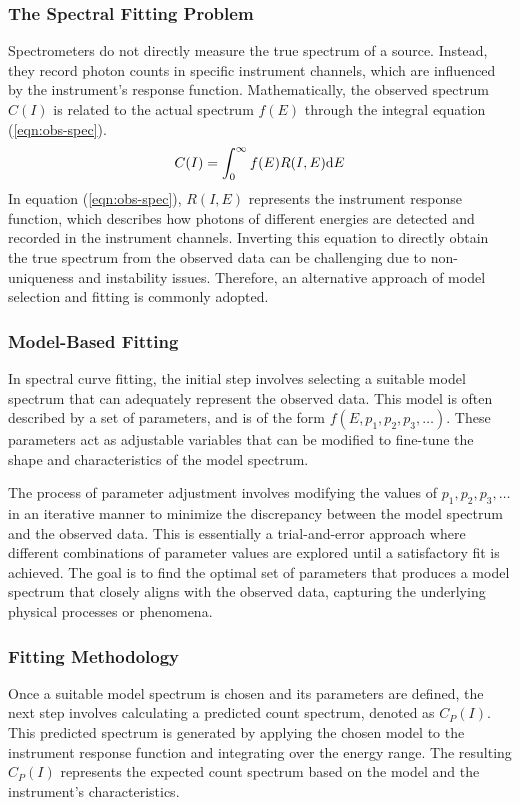 			\subsubsection{The Spectral Fitting Problem}
				Spectrometers do not directly measure the true spectrum of a source. Instead, they record photon counts in specific instrument channels, which are influenced by the instrument's response function. Mathematically, the observed spectrum $C(I)$ is related to the actual spectrum $f(E)$ through the integral equation (\ref{eqn:obs-spec}).
				\begin{align}
					C(I)=\int_0^\infty{f(E)R(I,E)\mathrm{d}E} \label{eqn:obs-spec}
				\end{align}
				In equation (\ref{eqn:obs-spec}), $R(I,E)$ represents the instrument response function, which describes how photons of different energies are detected and recorded in the instrument channels. Inverting this equation to directly obtain the true spectrum from the observed data can be challenging due to non-uniqueness and instability issues. Therefore, an alternative approach of model selection and fitting is commonly adopted.
			
			\subsubsection{Model-Based Fitting}
				In spectral curve fitting, the initial step involves selecting a suitable model spectrum that can adequately represent the observed data. This model is often described by a set of parameters, and is of the form $f(E,p_1,p_2,p_3,\dots)$. These parameters act as adjustable variables that can be modified to fine-tune the shape and characteristics of the model spectrum.
				
				The process of parameter adjustment involves modifying the values of $p_1,p_2,p_3,\dots$ in an iterative manner to minimize the discrepancy between the model spectrum and the observed data. This is essentially a trial-and-error approach where different combinations of parameter values are explored until a satisfactory fit is achieved. The goal is to find the optimal set of parameters that produces a model spectrum that closely aligns with the observed data, capturing the underlying physical processes or phenomena.
			
			\subsubsection{Fitting Methodology}
				Once a suitable model spectrum is chosen and its parameters are defined, the next step involves calculating a predicted count spectrum, denoted as $C_P(I)$. This predicted spectrum is generated by applying the chosen model to the instrument response function and integrating over the energy range. The resulting $C_P(I)$ represents the expected count spectrum based on the model and the instrument's characteristics.

